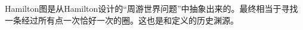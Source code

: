 
\begin{issues}
\issueDraft
\end{issues}

Hamilton图是从Hamilton设计的“周游世界问题”中抽象出来的。最终相当于寻找一条经过所有点一次恰好一次的圈。这也是和定义的历史渊源。
